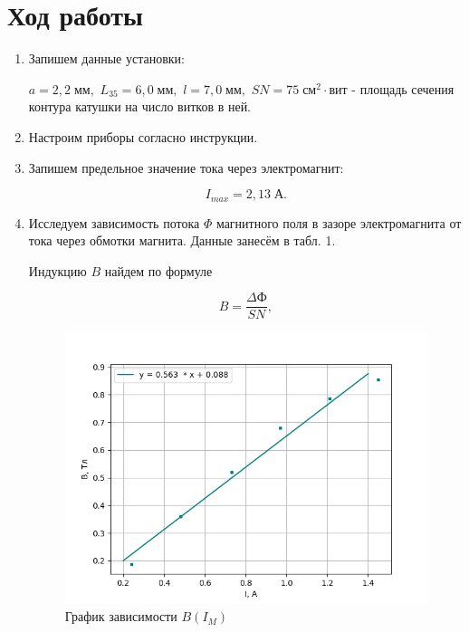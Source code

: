 \documentclass[12pt,a4paper]{article}
\begin{document}
  	\section{Ход работы}
  	
  	\begin{enumerate}
  	\item Запишем данные установки:
  	
  	$a=2,2 \; мм,$ $L_{35}=6,0 \;мм,$ $l=7,0 \;мм,$ $SN=75 \;см^{2}\cdot вит$ - площадь сечения контура катушки на число витков в ней.
  	
  	\item Настроим приборы согласно инструкции.
  	
  	\item Запишем предельное значение тока через электромагнит:
  	
  	$$ I_{max}=2,13 \; А.$$
  	
  	\item Исследуем зависимость потока $ \Phi $ магнитного поля в зазоре электромагнита от тока через обмотки магнита. Данные занесём в табл. 1.
  	
  	Индукцию $B$ найдем по формуле
  	
  \begin{equation}\label{}
  	B=\dfrac{\Delta Ф}{SN},
  \end{equation}
  	
  	

   \begin{figure}[h!]
	\centering
	\includegraphics[scale=0.7]{334graph1.png}
	\caption{График зависимости $ B(I_M) $}
\end{figure}


\end{enumerate}
\end{document}
